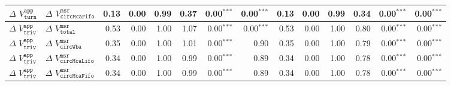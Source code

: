 \begin{tabular}{llrrrrrrrrrrrr}
  $\Delta$ $V^{\mathtt{app}}_{\mathtt{turn}}$ & $\Delta$ $V^{\mathtt{msr}}_{\mathtt{circMcaFifo}}$ & 0.13 & 0.00 & 0.99 &  0.37 & 0.00\(^{\ast} \)\(^{\ast} \)\(^{\ast} \) & 0.00\(^{\ast} \)\(^{\ast} \)\(^{\ast} \) & 0.13 & 0.00 & 0.99 &  0.34 & 0.00\(^{\ast} \)\(^{\ast} \)\(^{\ast} \) & 0.00\(^{\ast} \)\(^{\ast} \)\(^{\ast} \) \\ 
   \hline
$\Delta$ $V^{\mathtt{app}}_{\mathtt{triv}}$ & $\Delta$ $V^{\mathtt{msr}}_{\mathtt{total}}$ & 0.53 & 0.00 & 1.00 &  1.07 & 0.00\(^{\ast} \)\(^{\ast} \)\(^{\ast} \) & 0.00\(^{\ast} \)\(^{\ast} \)\(^{\ast} \) & 0.53 & 0.00 & 1.00 &  0.80 & 0.00\(^{\ast} \)\(^{\ast} \)\(^{\ast} \) & 0.00\(^{\ast} \)\(^{\ast} \)\(^{\ast} \) \\ 
  $\Delta$ $V^{\mathtt{app}}_{\mathtt{triv}}$ & $\Delta$ $V^{\mathtt{msr}}_{\mathtt{circWba}}$ & 0.35 & 0.00 & 1.00 &  1.01 & 0.00\(^{\ast} \)\(^{\ast} \)\(^{\ast} \) & 0.90 & 0.35 & 0.00 & 1.00 &  0.79 & 0.00\(^{\ast} \)\(^{\ast} \)\(^{\ast} \) & 0.00\(^{\ast} \)\(^{\ast} \)\(^{\ast} \) \\ 
  $\Delta$ $V^{\mathtt{app}}_{\mathtt{triv}}$ & $\Delta$ $V^{\mathtt{msr}}_{\mathtt{circMcaLifo}}$ & 0.34 & 0.00 & 1.00 &  0.99 & 0.00\(^{\ast} \)\(^{\ast} \)\(^{\ast} \) & 0.89 & 0.34 & 0.00 & 1.00 &  0.78 & 0.00\(^{\ast} \)\(^{\ast} \)\(^{\ast} \) & 0.00\(^{\ast} \)\(^{\ast} \)\(^{\ast} \) \\ 
  $\Delta$ $V^{\mathtt{app}}_{\mathtt{triv}}$ & $\Delta$ $V^{\mathtt{msr}}_{\mathtt{circMcaFifo}}$ & 0.34 & 0.00 & 1.00 &  0.99 & 0.00\(^{\ast} \)\(^{\ast} \)\(^{\ast} \) & 0.89 & 0.34 & 0.00 & 1.00 &  0.78 & 0.00\(^{\ast} \)\(^{\ast} \)\(^{\ast} \) & 0.00\(^{\ast} \)\(^{\ast} \)\(^{\ast} \) \\ 
   \hline
\end{tabular}
